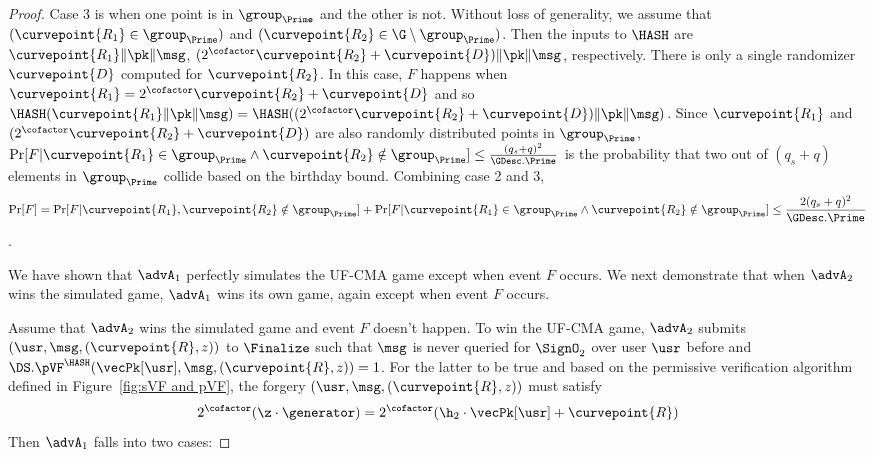 \begin{proof}
		Case 3 is when one point is in $\group_{\Prime}$ and the other is not. Without loss of generality, we assume that $(\curvepoint{R_1} \in \group_{\Prime})$ and $(\curvepoint{R_2} \in \G \setminus \group_{\Prime})$. Then the inputs to $\HASH$ are $\curvepoint{R_1}\|\pk\|\msg$, 
		$(2^\cofactor\curvepoint{R_2} + \curvepoint{D})\|\pk\|\msg$, respectively.
		There is only a single randomizer $\curvepoint{D}$ computed for $\curvepoint{R_2}$. In this case, $F$ happens when $\curvepoint{R_1} = 2^\cofactor \curvepoint{R_2} + \curvepoint{D}$ and so $\HASH(\curvepoint{R_1}\|\pk\| \msg) =  \HASH((2^\cofactor\curvepoint{R_2} + \curvepoint{D}) \|\pk\| \msg)$. Since $\curvepoint{R_1}$ and $(2^\cofactor\curvepoint{R_2} + \curvepoint{D})$ are also randomly distributed points in $\group_{\Prime}$, $\Pr[F | \curvepoint{R_1} \in \group_{\Prime} \wedge \curvepoint{R_2} \notin \group_{\Prime}] \leq \frac{(q_s + q)^2}{\GDesc.\Prime}$ is the probability that two out of $(q_s + q)$ elements in $\group_{\Prime}$ collide based on the birthday bound. Combining case 2 and 3, 
		\[\Pr[F] = \Pr[F | \curvepoint{R_1}, \curvepoint{R_2} \notin \group_{\Prime}] + \Pr[F | \curvepoint{R_1} \in \group_{\Prime} \wedge \curvepoint{R_2} \notin \group_{\Prime}] \leq \frac{2(q_s + q)^2}{\GDesc.\Prime}\].
		
		We have shown that $\advA_1$ perfectly simulates the UF-CMA game except when event $F$ occurs. We next demonstrate that when $\advA_2$ wins the simulated game, $\advA_1$ wins its own game, again except when event $F$ occurs. 
		
		Assume that $\advA_2$ wins the simulated game and event $F$ doesn't happen. To win the UF-CMA game, $\advA_2$ submits $(\usr, \msg, (\curvepoint{R}, z))$ to $\Finalize$ such that $\msg$ is never queried for $\SignO_2$ over user $\usr$ before and $\DS.\pVF^{\HASH}(\vecPk[\usr], \msg, (\curvepoint{R}, z)) = 1$. For the latter to be true and based on the permissive verification algorithm defined in Figure~\ref{fig:sVF and pVF}, the forgery $(\usr, \msg, (\curvepoint{R}, z))$ must satisfy 
		\begin{equation}
			2^\cofactor(\z \cdot  \generator) = 2^\cofactor (\h_2 \cdot \vecPk[\usr] + \curvepoint{R}) \label{eq:5}
		\end{equation}
		Then $\advA_1$ falls into two cases:
		

\end{proof}
